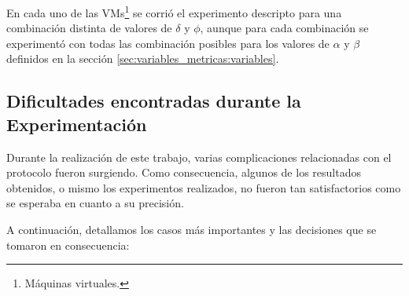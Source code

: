 \par En cada uno de las VMs\footnote{M\'aquinas virtuales.} se corri\'o el
experimento descripto para una combinaci\'on distinta de valores de $\delta$ y
$\phi$, aunque para cada combinaci\'on se experiment\'o con todas las
combinaci\'on posibles para los valores de $\alpha$ y $\beta$ definidos en la
secci\'on \ref{sec:variables_metricas:variables}.


\subsection{Dificultades encontradas durante la Experimentaci\'on}\label{sec:experimento:dificultades}
\par Durante la realizaci\'on de este trabajo, varias complicaciones
relacionadas con el protocolo fueron surgiendo. Como consecuencia, algunos de
los resultados obtenidos, o mismo los experimentos realizados, no fueron tan
satisfactorios como se esperaba en cuanto a su precisi\'on.

\par A continuaci\'on, detallamos los casos m\'as importantes y las decisiones
que se tomaron en consecuencia:

